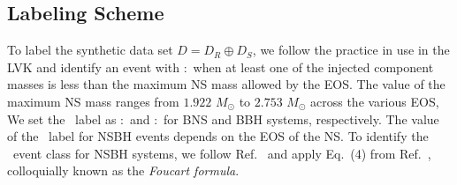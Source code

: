 \subsection{Labeling Scheme}\label{labeling}


To label the synthetic data set $D=D_R\oplus D_S$, we follow the practice in use in the \ac{LVK} and identify an event with \hasns:\true\ when at least one of the injected component masses is less
than the maximum \ac{NS} mass allowed by the \ac{EOS}. The value of the maximum \ac{NS} mass ranges from $1.922$ $M_{\odot}$ to $2.753$ $M_{\odot}$ across the various \ac{EOS}, %
 We set the \hasrem\ label as \hasrem:\true\ and \hasrem:\false\ for
\ac{BNS} and \ac{BBH} systems, respectively. The value of the \hasrem\ label for \ac{NSBH} events depends on the \ac{EOS} of the \ac{NS}. To identify the \hasrem\ event class for \ac{NSBH} systems, 
we follow Ref.~\cite{Chatterjee:2019avs} and apply Eq.~(4) from Ref.~\cite{Foucart:2018rjc}, colloquially known as the \emph{Foucart formula}.


